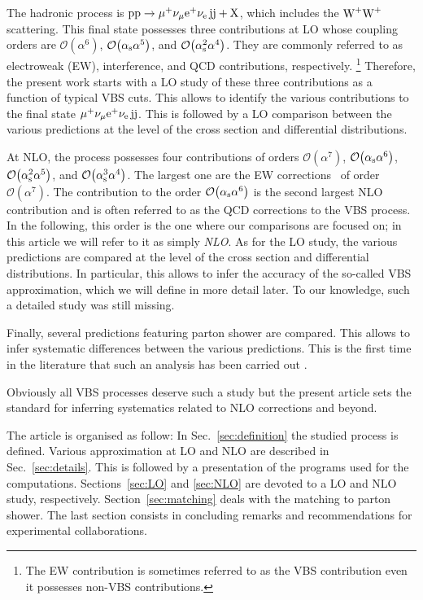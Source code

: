 The hadronic process is $\text{p}\text{p}\to\mu^+\nu_\mu{\rm e}^+\nu_{\rm e}\,\text{j}\text{j}+\mathrm{X}$, which includes the $\text{W}^+\text{W}^+$ scattering.
This final state possesses three contributions at LO whose coupling orders are $\mathcal{O}{\left(\alpha^{6}\right)}$, $\mathcal{O}{\left(\alpha_{\rm s}\alpha^{5}\right)}$, and $\mathcal{O}{\left(\alpha_\text{s}^{2}\alpha^{4}\right)}$.
They are commonly referred to as electroweak (EW), interference, and QCD contributions, respectively.%
\footnote{The EW contribution is sometimes referred to as the VBS contribution even it possesses non-VBS contributions.}
Therefore, the present work starts with a LO study of these three contributions as a function of typical VBS cuts.
This allows to identify the various contributions to the final state $\mu^+\nu_\mu{\rm e}^+\nu_{\rm e}\,\text{j}\text{j}$.
This is followed by a LO comparison between the various predictions at the level of the cross section and differential distributions.

At NLO, the process possesses four contributions of orders $\mathcal{O}{\left(\alpha^{7}\right)}$, $\mathcal{O}{\left(\alpha_\text{s}\alpha^{6}\right)}$, $\mathcal{O}{\left(\alpha_\text{s}^{2}\alpha^{5}\right)}$, and $\mathcal{O}{\left(\alpha_\text{s}^{3}\alpha^{4}\right)}$.
The largest one are the EW corrections~\cite{Biedermann:2017bss,Biedermann:2016yds} of order $\mathcal{O}{\left(\alpha^{7}\right)}$.
The contribution to the order $\mathcal{O}{\left(\alpha_\text{s}\alpha^{6}\right)}$ is the second largest NLO contribution and is often referred to as the QCD corrections to the VBS process.
In the following, this order is the one where our comparisons are focused on; in this article we will refer to it as simply \emph{NLO}.
As for the LO study, the various predictions are compared at the level of the cross section and differential distributions.
In particular, this allows to infer the accuracy of the so-called VBS approximation, which we will define in more detail later.
To our knowledge, such a detailed study was still missing.

Finally, several predictions featuring parton shower are compared.
This allows to infer systematic differences between the various predictions.
This is the first time in the literature that such an analysis has been carried out .

Obviously all VBS processes deserve such a study but the present article sets the standard for inferring systematics related to NLO corrections and beyond.


The article is organised as follow:
In Sec.~\ref{sec:definition} the studied process is defined.
Various approximation at LO and NLO are described in Sec.~\ref{sec:details}.
This is followed by a presentation of the programs used for the computations.
Sections~\ref{sec:LO} and \ref{sec:NLO} are devoted to a LO and NLO study, respectively.
Section~\ref{sec:matching} deals with the matching to parton shower.
The last section consists in concluding remarks and recommendations for experimental collaborations.
